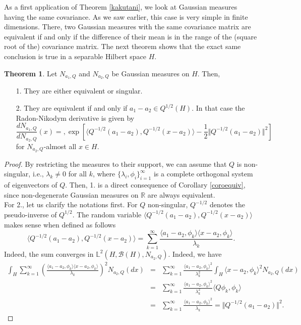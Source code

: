 \documentclass[10pt, a4paper]{report}
\newcommand{\Ll}[0]{\mathbb{L}}
\newcommand{\R}[0]{\mathbb{R}}
\theoremstyle{definition}
\newtheorem{theorem}{Theorem}
\theoremstyle{remark}
\begin{document}
As a first application of Theorem \ref{kakutani}, we look at Gaussian measures having the same covariance. As we saw earlier, this case is very simple in finite dimensions. There, two Gaussian measures with the same covariance matrix are equivalent if and only if the difference of their mean is in the range of the (square root of the) covariance matrix. The next theorem shows that the exact same conclusion is true in a separable Hilbert space $H$.
\begin{theorem}
	Let $N_{a_1,Q}$ and  $N_{a_2,Q}$ be Gaussian measures on $H$. Then,
	\begin{itemize}
		\item[1.] They are either equivalent or singular.
		\item[2.] They are equivalent if and only if $a_1-a_2 \in Q^{1/2}(H)$. In that case the Radon-Nikodym derivative is given by 
		$$\frac{dN_{a_1,Q}}{dN_{a_2,Q}}(x) = ,\exp\left[\langle Q^{-1/2}(a_1-a_2),Q^{-1/2}(x-a_2)\rangle - \frac{1}{2} \Vert Q^{-1/2}(a_1-a_2)\Vert^2 \right]$$
		for $N_{a_2,Q}$-almost all $x \in H$.
	\end{itemize}
	\begin{proof}
		By restricting the measures to their support, we can assume that $Q$ is non-singular, i.e., $\lambda_k \ne 0$ for all $k$, where $\{\lambda_i, \phi_i \}_{i=1}^\infty$ is a complete orthogonal system of eigenvectors of $Q$. Then, 1. is a direct consequence of Corollary \ref{coroequiv}, since non-degenerate Gaussian measures on $\R$ are always equivalent.\\
		For 2., let us clarify the notations first. For $Q$ non-singular, $Q^{-1/2}$ denotes the pseudo-inverse of $Q^{1/2}$. The random variable $\langle Q^{-1/2}(a_1-a_2),Q^{-1/2}(x-a_2)\rangle$ makes sense when defined as follows
		$$\langle Q^{-1/2}(a_1-a_2),Q^{-1/2}(x-a_2)\rangle = \sum_{k=1}^{\infty} \frac{\langle a_1-a_2,\phi_k\rangle\langle x-a_2,\phi_k\rangle}{\lambda_k}.$$
		Indeed, the sum converges in $\Ll^2(H,\mathcal{B}(H),N_{a_2,Q})$. Indeed, we have 
		\begin{eqnarray*}
			\int_H \sum_{k=1}^{\infty} \left(\frac{\langle a_1-a_2,\phi_k\rangle\langle x-a_2,\phi_k\rangle}{\lambda_k}\right)^2 N_{a_2,Q}(dx) & = & \sum_{k=1}^{\infty} \frac{\langle a_1-a_2,\phi_k\rangle^2}{\lambda_k^2}\int_H \langle x-a_2,\phi_k\rangle^2 N_{a_2,Q}(dx) \\
			& = & \sum_{k=1}^{\infty} \frac{\langle a_1-a_2,\phi_k\rangle^2}{\lambda_k^2} \langle Q\phi_k,\phi_k \rangle \\
			& = & \sum_{k=1}^{\infty} \frac{\langle a_1-a_2,\phi_k\rangle^2}{\lambda_k} = \Vert Q^{-1/2}(a_1-a_2)\Vert^2.

\end{eqnarray*}
\end{proof}
\end{theorem}
\end{document}
